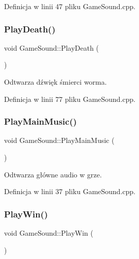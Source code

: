 Definicja w linii 47 pliku Game\+Sound.\+cpp.

\mbox{\label{class_game_sound_acd0ef105f4731da50afe47b3e02558a2}} 
\subsubsection{\texorpdfstring{Play\+Death()}{PlayDeath()}}
{\footnotesize\ttfamily void Game\+Sound\+::\+Play\+Death (\begin{DoxyParamCaption}{ }\end{DoxyParamCaption})}



Odtwarza dźwięk śmierci worma. 



Definicja w linii 77 pliku Game\+Sound.\+cpp.

\mbox{\label{class_game_sound_ad89f0cfad75194e895cb68437f9c231f}} 
\subsubsection{\texorpdfstring{Play\+Main\+Music()}{PlayMainMusic()}}
{\footnotesize\ttfamily void Game\+Sound\+::\+Play\+Main\+Music (\begin{DoxyParamCaption}{ }\end{DoxyParamCaption})}



Odtwarza główne audio w grze. 



Definicja w linii 37 pliku Game\+Sound.\+cpp.

\mbox{\label{class_game_sound_a429befa039bfc4e9f7b33326fbb090a4}} 
\subsubsection{\texorpdfstring{Play\+Win()}{PlayWin()}}
{\footnotesize\ttfamily void Game\+Sound\+::\+Play\+Win (\begin{DoxyParamCaption}{ }\end{DoxyParamCaption})}



